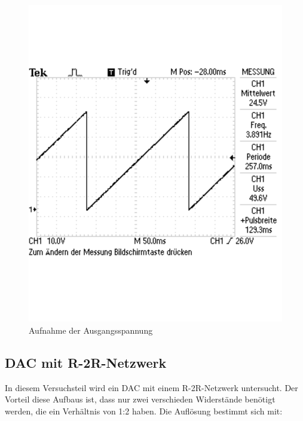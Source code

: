 \documentclass[12pt,a4paper]{article}
\begin{document}
\begin{figure}[H] 
  \centering 	
    \includegraphics[trim = 0mm 50mm 0mm 50mm, clip, scale = 0.4]{1_1_2.pdf}
  	\caption[Aufnahme der Ausgangsspannung]{Aufnahme der Ausgangsspannung} 
  \label{fig:1_1_2}
\end{figure}



\subsection{DAC mit R-2R-Netzwerk}

In diesem Versuchsteil wird ein DAC mit einem R-2R-Netzwerk untersucht. Der Vorteil diese Aufbaus ist, dass nur zwei verschieden Widerstände benötigt werden, die ein Verhältnis von 1:2 haben. Die Auflösung bestimmt sich mit:
\end{document}
